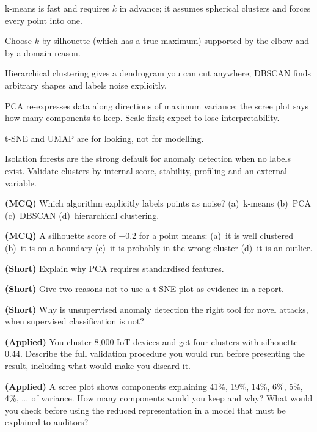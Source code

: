 \begin{chaptersummary}
\begin{tight}
  \item k-means is fast and requires $k$ in advance; it assumes spherical clusters
        and forces every point into one.
  \item Choose $k$ by silhouette (which has a true maximum) supported by the elbow
        and by a domain reason.
  \item Hierarchical clustering gives a dendrogram you can cut anywhere; DBSCAN
        finds arbitrary shapes and labels noise explicitly.
  \item PCA re-expresses data along directions of maximum variance; the scree plot
        says how many components to keep. Scale first; expect to lose
        interpretability.
  \item t-SNE and UMAP are for looking, not for modelling.
  \item Isolation forests are the strong default for anomaly detection when no
        labels exist. Validate clusters by internal score, stability, profiling and
        an external variable.
\end{tight}
\end{chaptersummary}

\begin{reviewq}
  \item \textbf{(MCQ)} Which algorithm explicitly labels points as noise?
        (a)~k-means (b)~PCA (c)~DBSCAN (d)~hierarchical clustering.
  \item \textbf{(MCQ)} A silhouette score of $-0.2$ for a point means:
        (a)~it is well clustered (b)~it is on a boundary (c)~it is probably in the
        wrong cluster (d)~it is an outlier.
  \item \textbf{(Short)} Explain why PCA requires standardised features.
  \item \textbf{(Short)} Give two reasons not to use a t-SNE plot as evidence in a
        report.
  \item \textbf{(Short)} Why is unsupervised anomaly detection the right tool for
        novel attacks, when supervised classification is not?
  \item \textbf{(Applied)} You cluster 8{,}000 IoT devices and get four clusters
        with silhouette 0.44. Describe the full validation procedure you would run
        before presenting the result, including what would make you discard it.
  \item \textbf{(Applied)} A scree plot shows components explaining 41\%, 19\%,
        14\%, 6\%, 5\%, 4\%, \dots\ of variance. How many components would you keep
        and why? What would you check before using the reduced representation in a
        model that must be explained to auditors?
\end{reviewq}
